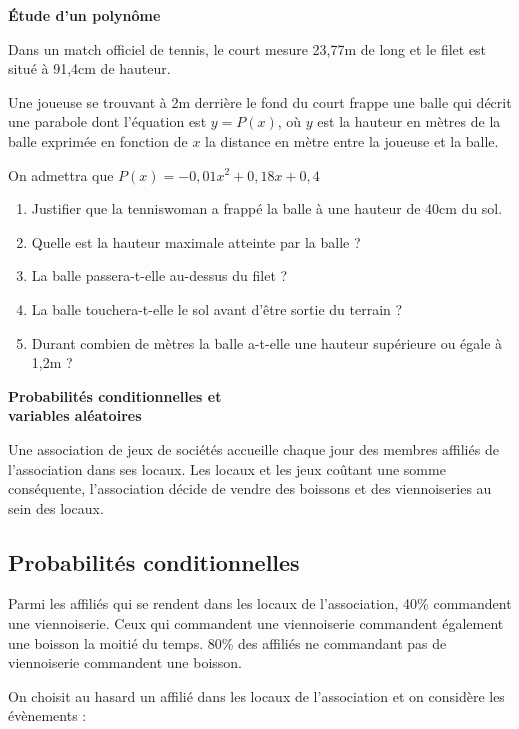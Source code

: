\documentclass[oneside,12pt]{article}
\begin{document}
\vspace{1cm}
\textbf{\huge Étude d'un polynôme}

Dans un match officiel de tennis, le court mesure 23,77m de long et le filet est situé à 91,4cm de hauteur.

Une joueuse se trouvant à 2m derrière le fond du court frappe une balle qui décrit une parabole dont l'équation est $y=P(x)$, où $y$ est la hauteur en mètres de la balle exprimée en fonction de $x$ la distance en mètre entre la joueuse et la balle.

On admettra que $P(x)=-0,01x^2+0,18x+0,4$
\begin{enumerate}
	\item Justifier que la tenniswoman a frappé la balle à une hauteur de 40cm du sol.
	\item Quelle est la hauteur maximale atteinte par la balle ?
	\item La balle passera-t-elle au-dessus du filet ?
	\item La balle touchera-t-elle le sol avant d'être sortie du terrain ?
	\item Durant combien de mètres la balle a-t-elle une hauteur supérieure ou égale à 1,2m ?
\end{enumerate}




\newpage
\textbf{\huge Probabilités conditionnelles et \\ variables aléatoires}

Une association de jeux de sociétés accueille chaque jour des membres affiliés de l'association dans ses locaux. Les locaux et les jeux coûtant une somme conséquente, l'association décide de vendre des boissons et des viennoiseries au sein des locaux.

\subsection{Probabilités conditionnelles}
Parmi les affiliés qui se rendent dans les locaux de l'association, 40\% commandent une viennoiserie. Ceux qui commandent une viennoiserie commandent également une boisson la moitié du temps. 80\% des affiliés ne commandant pas de viennoiserie commandent une boisson.

On choisit au hasard un affilié dans les locaux de l'association et on considère les évènements :
\end{document}
